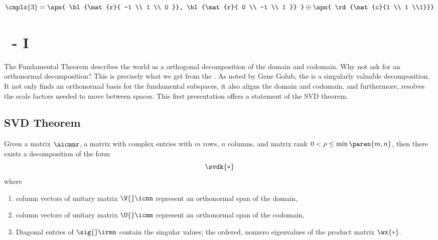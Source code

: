  \begin{equation*}   %
      \cmplx{3} = \spn { \bl{\mat{r}{ -1 \\ 1 \\ 0 }}, \bl{\mat{r}{ 0 \\ -1 \\ 1 }} } \oplus \spn { \rd{\mat{c}{1 \\ 1 \\1}}}
  \end{equation*}

\section{\bsvd\ - I}  %
The Fundamental Theorem describes the world as a orthogonal decomposition of the domain and codomain. Why not ask for an orthonormal decomposition? This is precisely what we get from the \asvd.
As noted by Gene Golub, the \asvd is a singularly valuable decomposition. It not only finds an orthonormal basis for the fundamental subspaces, it also aligns the domain and codomain, and furthermore, resolves the scale factors needed to move between spaces. This first presentation offers a statement of the SVD theorem.

\subsection{SVD Theorem}  %
Given a matrix $\aicmnr$, a matrix with complex entries with $m$ rows, $n$ columns, and matrix rank $0<\rho\le\min\paren{m,n}$, then there exists a decomposition of the form
  \begin{equation*}   %
    \svdk{*}
  \end{equation*}
where
\begin{enumerate}
  \item column vectors of unitary matrix $\V{}\icnn$ represent an orthonormal span of the domain,
  \item column vectors of unitary matrix $\U{}\icmm$ represent an orthonormal span of the codomain,
  \item Diagonal entries of $\sig{}\irmn$ contain the singular values; the ordered, nonzero eigenvalues of the product matrix $\wx{*}$.
\end{enumerate}

